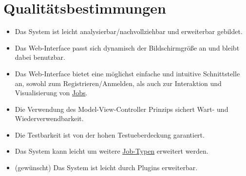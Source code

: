 \section{Qualitätsbestimmungen}
\begin{itemize}    
    \item Das System ist leicht analysierbar/nachvollziehbar und erweiterbar gebildet.
    \item Das \gls{Web-Interface} passt sich dynamisch der Bildschirmgröße an und bleibt dabei benutzbar.
    \item Das \gls{Web-Interface} bietet eine möglichst einfache und intuitive Schnittstelle an, sowohl zum Registrieren/Anmelden, als auch zur Interaktion und Visualisierung von \hyperref[B:Jobs]{Jobs}.
    \item Die Verwendung des \gls{Model-View-Controller} Prinzips sichert Wart- und Wiederverwendbarkeit.
    \item Die Testbarkeit ist von der hohen \gls{Testueberdeckung} garantiert.
    \item Das System kann leicht um weitere \hyperref[B:Job-Typ]{Job-Typen} erweitert werden.
    \item (gewünscht) Das System ist leicht durch Plugins erweiterbar.
\end{itemize}


